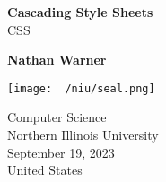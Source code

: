 \documentclass{report}
\title{\Huge{}}
\author{\huge{Nathan Warner}}
\date{\huge{}}
\begin{document}
        \begin{titlepage}
       \begin{center}
           \vspace*{1cm}
    
           \textbf{Cascading Style Sheets} \\
           CSS
    
           \vspace{0.5cm}
            
                
           \vspace{1.5cm}
    
           \textbf{Nathan Warner}
    
           \vfill
                
                

           \vspace{0.8cm}
         
           \texttt{[image: ~/niu/seal.png]}
                
           Computer Science \\
           Northern Illinois University\\
           September 19, 2023 \\
           United States\\
           
                
       \end{center}
    \end{titlepage}
    \tableofcontents
    \pagebreak \bigbreak \noindent
\end{document}
